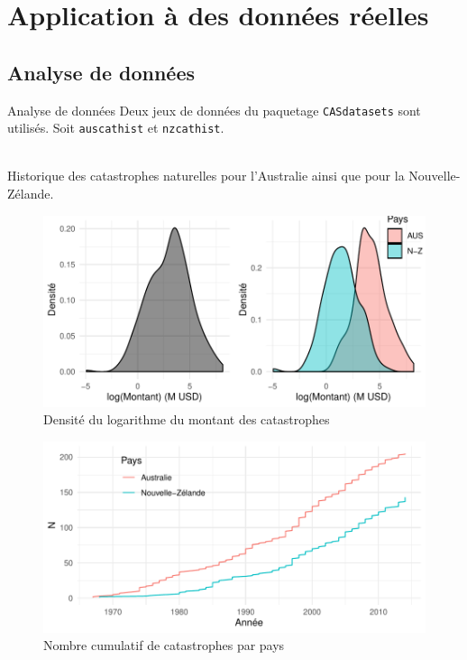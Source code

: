 

\section{Application à des données réelles}

\subsection{Analyse de données}



\begin{frame}{Analyse de données}
Deux jeux de données du paquetage \texttt{CASdatasets} sont utilisés. Soit \texttt{auscathist} et \texttt{nzcathist}.\\~\\ \pause

Historique des catastrophes naturelles pour l'Australie ainsi que pour la Nouvelle-Zélande.
\end{frame}


\begin{frame}
\begin{figure}
\includegraphics[width=.8\textwidth]{images/fig-005.pdf}
\caption{Densité du logarithme du montant des catastrophes}
\end{figure}
\end{frame}

\begin{frame}
\begin{figure}
\includegraphics[width=.8\textwidth]{images/fig-006.pdf}
\caption{Nombre cumulatif de catastrophes par pays}
\end{figure}
\end{frame}

